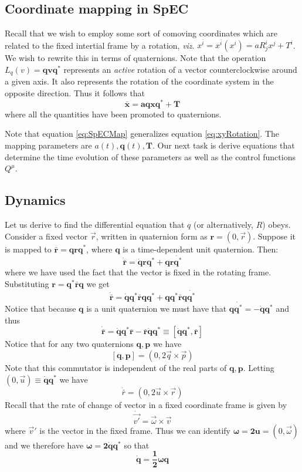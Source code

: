 \documentclass[aps, prd, amsmath, floats, floatfix, twocolumn,superscriptaddress, nofootinbib, showpacs]{revtex4-1}
\theoremstyle{plain}
\theoremstyle{definition}
\newcommand{\w}[1]{\mathbf{#1}}
\begin{document}
\subsection{Coordinate mapping in SpEC}
Recall that we wish to employ some sort of comoving coordinates which are 
related to the fixed intertial frame by a rotation, \emph{viz}. 
$x^{\bar{i}}=x^{\bar{i}}(x^i)=aR^i_jx^j+T^{i}$. We wish to rewrite this in terms of 
quaternions. Note that the operation $L_q(v)=\w{qvq^*}$ represents an \emph{active}
rotation of a vector counterclockwise around a given axis. It also represents
the rotation of the coordinate system in the opposite direction. Thus it 
follows that
\begin{equation}
  \label{eq:SpECMap}
  \w{\bar{x}=aqxq^* + T}
\end{equation}
 where all the quantities have been promoted to quaternions.


Note that equation \ref{eq:SpECMap} generalizes equation \ref{eq:xyRotation}. The mapping parameters are $a(t),\w{q}(t),\w{T}$. Our next task is derive equations that determine the time evolution of these parameters as well as the control functions $Q^{\mu}$.



\subsection{Dynamics}

Let us derive to find the differential equation that $q$ (or alternatively, $R$)
obeys. Consider a fixed vector $\vec{r}$, written in quaternion form as $\w{r}=(0,\vec{r})$. Suppose it is mapped to $\bar{\w{r}}=\w{qrq^{*}}$, where $\w{q}$ is a time-dependent unit quaternion. Then:
\[\w{ \dot{\bar{r}}=\dot{q}rq^*+qr\dot{q^*}}\]
where we have used the fact that the vector is fixed in the rotating frame. 
Substituting $\w{r=q^*\bar{r}q}$ we get
\[
\w{\dot{\bar{r}}=\dot{q}q^*\bar{r}qq^*+qq^*\bar{r}q\dot{q^*}}
\]
Notice that because $\w{q}$ is a unit quaternion we must 
have that $\w{q\dot{q^*}=-\dot{q}q^*} $ and thus
\[
\w{\dot{\bar{r}}}=\dot{\w{q}}\w{q}^*\w{\bar{r}}-\w{\bar{r}}\dot{\w{q}}\w{q}^* \equiv [\dot{\w{q}}\w{q}^*,\w{\bar{r}}]
\]
Notice that for any two quaternions $\w{q,p}$ we have 
\[ [\w{q,p}]=(0,2\vec{q}\times\vec{p})\]
Note that this commutator is independent of the real parts of $\w{q,p}$.
Letting $(0,\vec{u})\equiv\dot{\w{q}}\w{q}^*$ we have
\[ \dot{\bar{r}}=(0,2\vec{u}\times\vec{r})\]
Recall that the rate of change of vector in a fixed coordinate frame is given by\cite{goldstein2002classical} 
\[\dot{\vec{v'}}=\vec{\omega}\times \vec{v}\] 
where $\vec{v}'$ is the vector in the fixed frame.
Thus we can identify $\w{\omega=2u}=(0,\vec{\omega})$ and we therefore have 
$\w{\omega=2\dot{q}q^*}$ so that
\[\w{\dot{q}=\frac{1}{2}\omega q}\]
\end{document}
